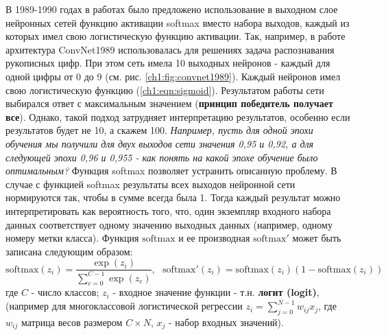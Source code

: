 \documentclass[12pt]{article}
\begin{document}
\begin{sloppypar}
В 1989-1990 годах в работах \cite{bridle1990training, bridle1990probabilistic} было предложено использование в выходном слое нейронных сетей функцию активации softmax вместо набора выходов, каждый из которых имел свою логистическую функцию активации. Так, например, в работе \cite{lecun1989generalization}  архитектура ConvNet1989 использовалась для решениях задача распознавания рукописных цифр. При этом сеть имела 10 выходных нейронов - каждый для одной цифры от 0 до 9 (см. рис. \ref{ch1:fig:convnet1989}). Каждый нейронов имел свою логистическую функцию (\ref{ch1:eqn:sigmoid}). Результатом работы сети выбирался ответ с максимальным значением (\textbf{принцип победитель получает все}). Однако, такой подход затрудняет интерпретацию результатов, особенно если результатов будет не 10, а скажем 100. \textit{Например, пусть для одной эпохи обучения мы получили для двух выходов сети значения 0,95 и 0,92, а для следующей эпохи 0,96 и 0,955 - как понять на какой эпохе обучение было оптимальным?} Функция softmax позволяет устранить описанную проблему. В случае с функцией softmax результаты всех выходов нейронной сети нормируются так, чтобы в сумме всегда была 1. Тогда каждый результат можно интерпретировать как вероятность того, что, один экземпляр входного набора данных соответствует одному значению выходных данных (например, одному номеру метки класса). Функция $\mathrm{softmax}$ и ее производная $\mathrm{softmax}'$ может быть записана следующим образом:
    \begin{equation}
    \label{ch1:eqn:softmax}
        \mathrm{softmax}(z_i) = \dfrac{\exp(z_i)}{\sum_{c=0}^{C-1}\exp(z_c)}, \ \ \  \mathrm{softmax}'(z_i) = \mathrm{softmax}(z_i)(1-\mathrm{softmax}(z_i))
    \end{equation}
где $C$ - число классов; $z_i$ - входное значение функции - т.н. \textbf{логит (logit)}, (например для многоклассовой логистической регрессии $z_i = \sum_{j=0}^{N-1}w_{ij}x_j$, где $w_{ij}$ матрица весов размером $C\times N$,  $x_j$ - набор входных значений).


\end{sloppypar}
\end{document}

